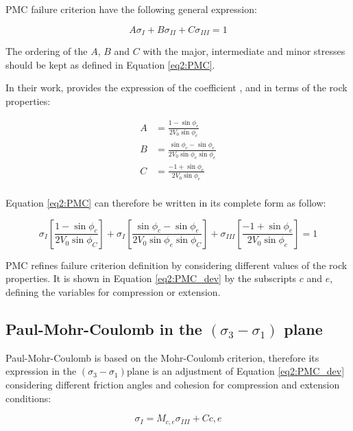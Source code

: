 PMC failure criterion have the following general expression:

\begin{equation}\label{eq2:PMC}
    A\sigma_I + B\sigma_{II}+C\sigma_{III} = 1
\end{equation}

The ordering of the $A$, $B$ and $C$ with the major, intermediate and minor stresses should be kept as defined in Equation \ref{eq2:PMC}. 

In their work, \cite[Meyer and Labuz (2013)]{Meyer2013} provides the expression of the coefficient ,  and  in terms of the rock properties:

\begin{align}
    A &= \frac{1-\sin \phi_c}{2V_0\sin \phi_c} \\
    B &= \frac{\sin \phi_c - \sin \phi_e}{2V_0 \sin \phi_e \sin \phi_c} \\
    C &= \frac{-1+\sin \phi_e}{2V_0\sin \phi_e} \\
\end{align}

Equation \ref{eq2:PMC} can therefore be written in its complete form as follow:

\begin{equation}\label{eq2:PMC_dev}
    \sigma_{I}\left[\frac{1-\sin \phi_{c}}{2 V_{0} \sin \phi_{C}}\right]+\sigma_{I}\left[\frac{\sin \phi_{c}-\sin \phi_{e}}{2 V_{0} \sin \phi_{e} \sin \phi_{C}}\right]+\sigma_{I I I}\left[\frac{-1+\sin \phi_{e}}{2 V_{0} \sin \phi_{e}}\right]=1
\end{equation}

PMC refines failure criterion definition by considering different values of the rock properties.  It is shown in Equation \ref{eq2:PMC_dev} by the subscripts $c$ and $e$, defining the variables for compression or extension.

\subsection{Paul-Mohr-Coulomb in the \texorpdfstring{$(\sigma_3 -\sigma_1)$}{sigma 3 - sigma 1} plane}\label{ch2:PMCsig1sig3}

Paul-Mohr-Coulomb is based on the Mohr-Coulomb criterion, therefore its expression in the  $(\sigma_3 -\sigma_1)$plane is an adjustment of Equation \ref{eq2:PMC_dev} considering different friction angles and cohesion for compression and extension conditions: 

\begin{equation}\label{eq2:PMC_sig1sig3}
    \sigma_I = M_{c,e}\sigma_{III}+C{c,e}
\end{equation}

